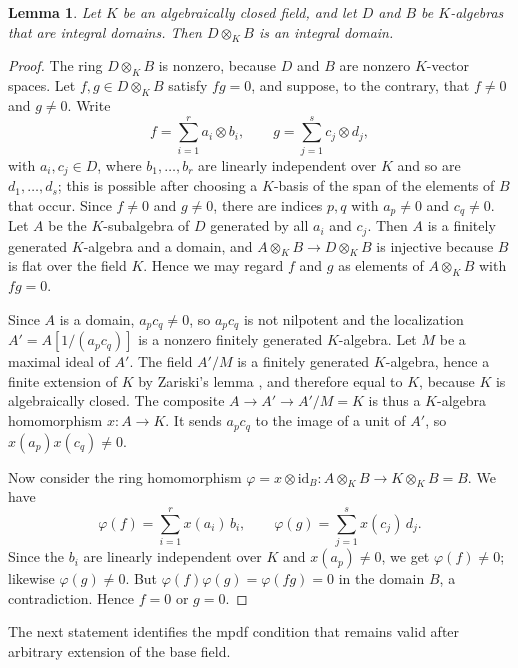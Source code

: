 \documentclass[11pt,a4paper]{amsart}
\newtheorem{lemma}[theorem]{Lemma}
\theoremstyle{definition}
\theoremstyle{remark}
\numberwithin{equation}{section}
\begin{document}
\begin{lemma}\label{lem:tensor-domain}
Let $K$ be an algebraically closed field, and let $D$ and $B$ be $K$-algebras that are integral domains. Then $D\otimes_K B$ is an integral domain.
\end{lemma}
\begin{proof}
The ring $D\otimes_K B$ is nonzero, because $D$ and $B$ are nonzero $K$-vector spaces.
Let $f,g\in D\otimes_K B$ satisfy $fg=0$, and suppose, to the contrary, that $f\neq0$ and $g\neq0$.
Write
\[ f=\sum_{i=1}^{r}a_i\otimes b_i,\qquad g=\sum_{j=1}^{s}c_j\otimes d_j, \]
with $a_i,c_j\in D$, where $b_1,\dots,b_r$ are linearly independent over $K$ and so are $d_1,\dots,d_s$; this is possible after choosing a $K$-basis of the span of the elements of $B$ that occur.
Since $f\neq0$ and $g\neq0$, there are indices $p,q$ with $a_p\neq0$ and $c_q\neq0$.
Let $A$ be the $K$-subalgebra of $D$ generated by all $a_i$ and $c_j$.
Then $A$ is a finitely generated $K$-algebra and a domain, and $A\otimes_K B\to D\otimes_K B$ is injective because $B$ is flat over the field $K$.
Hence we may regard $f$ and $g$ as elements of $A\otimes_K B$ with $fg=0$.

Since $A$ is a domain, $a_pc_q\neq0$, so $a_pc_q$ is not nilpotent and the localization $A'=A[1/(a_pc_q)]$ is a nonzero finitely generated $K$-algebra.
Let $M$ be a maximal ideal of $A'$.
The field $A'/M$ is a finitely generated $K$-algebra, hence a finite extension of $K$ by Zariski's lemma \cite[Proposition~7.9]{AM}, and therefore equal to $K$, because $K$ is algebraically closed.
The composite $A\to A'\to A'/M=K$ is thus a $K$-algebra homomorphism $x:A\to K$.
It sends $a_pc_q$ to the image of a unit of $A'$, so $x(a_p)x(c_q)\neq0$.

Now consider the ring homomorphism $\varphi=x\otimes\mathrm{id}_B:A\otimes_K B\to K\otimes_K B=B$.
We have
\[ \varphi(f)=\sum_{i=1}^{r}x(a_i)\,b_i,\qquad \varphi(g)=\sum_{j=1}^{s}x(c_j)\,d_j. \]
Since the $b_i$ are linearly independent over $K$ and $x(a_p)\neq0$, we get $\varphi(f)\neq0$; likewise $\varphi(g)\neq0$.
But $\varphi(f)\varphi(g)=\varphi(fg)=0$ in the domain $B$, a contradiction.
Hence $f=0$ or $g=0$.
\end{proof}

The next statement identifies the mpdf condition that remains valid
after arbitrary extension of the base field.
\end{document}

